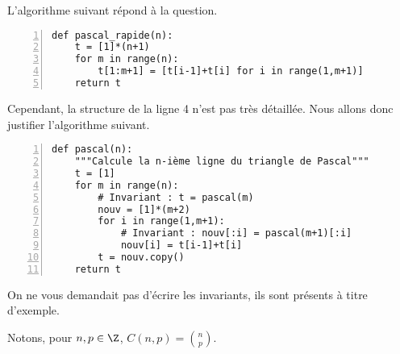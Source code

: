 \exer{}
\setcounter{numques}{0}

L'algorithme suivant répond à la question. 
\begin{Verbatim}[gobble=0,numbers=left]
def pascal_rapide(n):
    t = [1]*(n+1)
    for m in range(n):
        t[1:m+1] = [t[i-1]+t[i] for i in range(1,m+1)]
    return t
\end{Verbatim}
Cependant, la structure de la ligne 4 n'est pas très détaillée. Nous allons donc justifier l'algorithme suivant. 
\begin{Verbatim}[gobble=0,numbers=left]
def pascal(n):
    """Calcule la n-ième ligne du triangle de Pascal"""
    t = [1]
    for m in range(n):
        # Invariant : t = pascal(m)
        nouv = [1]*(m+2)
        for i in range(1,m+1):
            # Invariant : nouv[:i] = pascal(m+1)[:i]
            nouv[i] = t[i-1]+t[i]
        t = nouv.copy()
    return t
\end{Verbatim}
\begin{rem}
  On ne vous demandait pas d'écrire les invariants, ils sont présents à titre d'exemple. 
\end{rem}
Notons, pour $n,p\in\Z$, $\displaystyle C(n,p) = \binom{n}{p}$.
